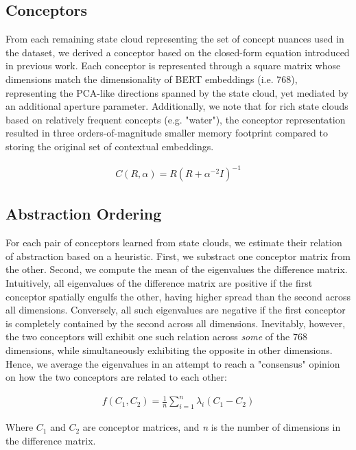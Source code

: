 \subsection{Conceptors}

From each remaining state cloud representing the set of concept nuances used in the dataset, we derived a conceptor based on the closed-form equation introduced in previous work. Each conceptor is represented through a square matrix whose dimensions match the dimensionality of BERT embeddings (i.e. 768), representing the PCA-like directions spanned by the state cloud, yet mediated by an additional aperture parameter. Additionally, we note that for rich state clouds based on relatively frequent concepts (e.g. "water"), the conceptor representation resulted in three orders-of-magnitude smaller memory footprint compared to storing the original set of contextual embeddings.

\begin{align*}
    C(R, \alpha) = R (R + \alpha^{-2} I)^{-1}
\end{align*}

\subsection{Abstraction Ordering}

For each pair of conceptors learned from state clouds, we estimate their relation of abstraction based on a heuristic. First, we substract one conceptor matrix from the other. Second, we compute the mean of the eigenvalues the difference matrix. Intuitively, all eigenvalues of the difference matrix are positive if the first conceptor spatially engulfs the other, having higher spread than the second across all dimensions. Conversely, all such eigenvalues are negative if the first conceptor is completely contained by the second across all dimensions. Inevitably, however, the two conceptors will exhibit one such relation across \textit{some} of the 768 dimensions, while simultaneously exhibiting the opposite in other dimensions. Hence, we average the eigenvalues in an attempt to reach a "consensus" opinion on how the two conceptors are related to each other:

\begin{align*}
    f(C_1, C_2) = \frac{1}{n} \sum\limits_{i=1}^n \lambda_i(C_1 - C_2)
\end{align*}

Where $C_1$ and $C_2$ are conceptor matrices, and \textit{n} is the number of dimensions in the difference matrix.

